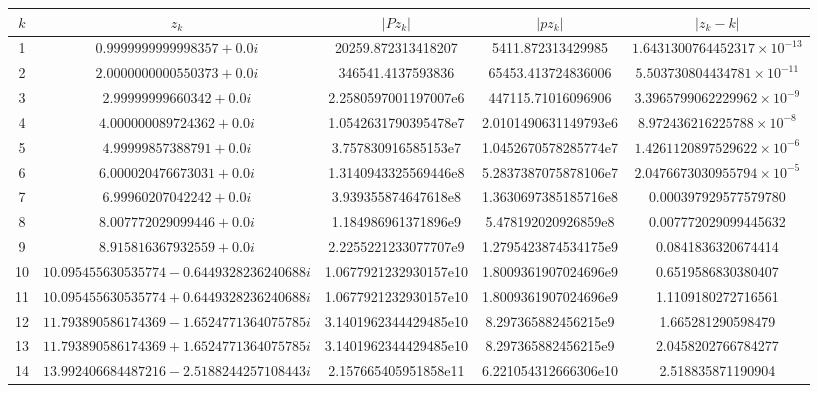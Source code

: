 \documentclass[15pt, a4paper]{article}
\begin{document}
\begin{table}[h]
    \centering
    \begin{adjustbox}{max width=\textwidth}
    \begin{tabular}{|c|c|c|c|c|}
        \hline
        \(k\) & \(z_k\) & \(|Pz_k|\) & \(|pz_k|\) & \(|z_k - k|\) \\ \hline
        1 & \(0.9999999999998357 + 0.0i\) & 20259.872313418207 & 5411.872313429985 & \(1.6431300764452317 \times 10^{-13}\) \\ \hline
        2 & \(2.0000000000550373 + 0.0i\) & 346541.4137593836 & 65453.413724836006 & \(5.503730804434781 \times 10^{-11}\) \\ \hline
        3 & \(2.99999999660342 + 0.0i\) & 2.2580597001197007e6 & 447115.71016096906 & \(3.3965799062229962 \times 10^{-9}\) \\ \hline
        4 & \(4.000000089724362 + 0.0i\) & 1.0542631790395478e7 & 2.0101490631149793e6 & \(8.972436216225788 \times 10^{-8}\) \\ \hline
        5 & \(4.99999857388791 + 0.0i\) & 3.757830916585153e7 & 1.0452670578285774e7 & \(1.4261120897529622 \times 10^{-6}\) \\ \hline
        6 & \(6.000020476673031 + 0.0i\) & 1.3140943325569446e8 & 5.2837387075878106e7 & \(2.0476673030955794 \times 10^{-5}\) \\ \hline
        7 & \(6.99960207042242 + 0.0i\) & 3.939355874647618e8 & 1.3630697385185716e8 & 0.000397929577579780 \\ \hline
        8 & \(8.007772029099446 + 0.0i\) & 1.184986961371896e9 & 5.478192020926859e8 & 0.007772029099445632 \\ \hline
        9 & \(8.915816367932559 + 0.0i\) & 2.2255221233077707e9 & 1.2795423874534175e9 & 0.0841836320674414 \\ \hline
        10 & \(10.095455630535774 - 0.6449328236240688i\) & 1.0677921232930157e10 & 1.8009361907024696e9 & 0.6519586830380407 \\ \hline
        11 & \(10.095455630535774 + 0.6449328236240688i\) & 1.0677921232930157e10 & 1.8009361907024696e9 & 1.1109180272716561 \\ \hline
        12 & \(11.793890586174369 - 1.6524771364075785i\) & 3.1401962344429485e10 & 8.297365882456215e9 & 1.665281290598479 \\ \hline
        13 & \(11.793890586174369 + 1.6524771364075785i\) & 3.1401962344429485e10 & 8.297365882456215e9 & 2.0458202766784277 \\ \hline
        14 & \(13.992406684487216 - 2.5188244257108443i\) & 2.157665405951858e11 & 6.221054312666306e10 & 2.518835871190904 \\ \hline

\end{tabular}
\end{adjustbox}
\end{table}
\end{document}
